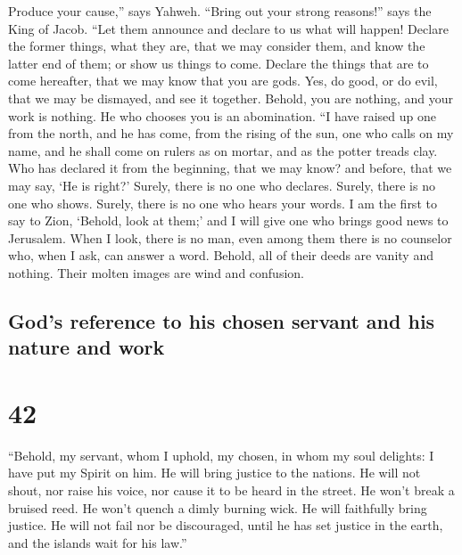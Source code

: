  Produce your cause,'' says Yahweh. ``Bring out your
strong reasons!'' says the King of Jacob.  ``Let them
announce and declare to us what will happen! Declare the former things,
what they are, that we may consider them, and know the latter end of
them; or show us things to come.  Declare the things that
are to come hereafter, that we may know that you are gods. Yes, do good,
or do evil, that we may be dismayed, and see it together.
 Behold, you are nothing, and your work is nothing. He
who chooses you is an abomination.  ``I have raised up
one from the north, and he has come, from the rising of the sun, one who
calls on my name, and he shall come on rulers as on mortar, and as the
potter treads clay.  Who has declared it from the
beginning, that we may know? and before, that we may say, `He is right?'
Surely, there is no one who declares. Surely, there is no one who shows.
Surely, there is no one who hears your words.  I am the
first to say to Zion, `Behold, look at them;' and I will give one who
brings good news to Jerusalem.  When I look, there is no
man, even among them there is no counselor who, when I ask, can answer a
word.  Behold, all of their deeds are vanity and nothing.
Their molten images are wind and confusion.

\hypertarget{gods-reference-to-his-chosen-servant-and-his-nature-and-work}{%
\subsection{God's reference to his chosen servant and his nature and
work}\label{gods-reference-to-his-chosen-servant-and-his-nature-and-work}}

\hypertarget{section-41}{%
\section{42}\label{section-41}}

 ``Behold, my servant, whom I uphold, my chosen, in whom
my soul delights: I have put my Spirit on him. He will bring justice to
the nations.  He will not shout, nor raise his voice, nor
cause it to be heard in the street.  He won't break a
bruised reed. He won't quench a dimly burning wick. He will faithfully
bring justice.  He will not fail nor be discouraged, until
he has set justice in the earth, and the islands wait for his law.''

